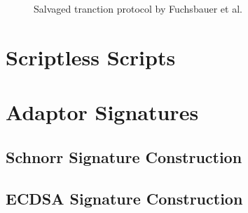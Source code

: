\begin{figure}
    \label{fig:txSalvaged}
    \centering
    \caption{Salvaged tranction protocol by Fuchsbauer et al.~\cite{fuchsbauer2019aggregate}}
\end{figure}

\section{Scriptless Scripts}\label{sec:scriptlessScripts}

\section{Adaptor Signatures}\label{sec:aptSignatures}

\subsection{Schnorr Signature Construction}\label{sec:schnorrAptSignatures}

\subsection{ECDSA Signature Construction}\label{sec:ecdsaAptSignatures}
